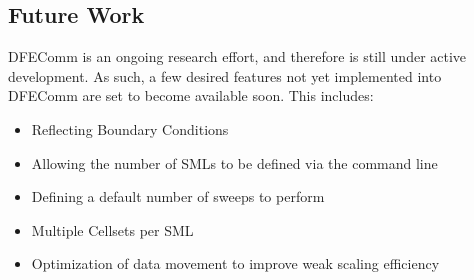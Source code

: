 \documentclass{article}
\begin{document}
\subsection{Future Work} \label{future}
DFEComm is an ongoing research effort, and therefore is still under active development. As such, a few desired features not yet implemented into DFEComm are set to become available soon. This includes:
\begin{itemize}
	\item Reflecting Boundary Conditions
	\item Allowing the number of SMLs to be defined via the command line
	\item Defining a default number of sweeps to perform
	\item Multiple Cellsets per SML
	\item Optimization of data movement to improve weak scaling efficiency
\end{itemize}

%
\pagebreak

\renewcommand{\bibname}{{\normalsize\rm REFERENCES}}

\end{document}

